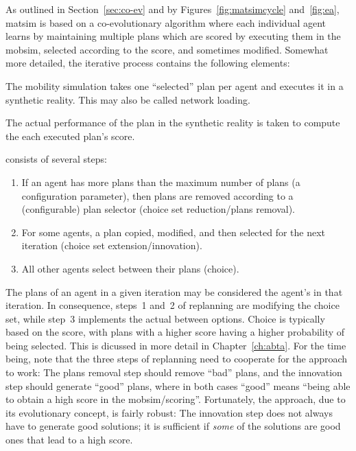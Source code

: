 As outlined in Section~\ref{sec:co-ev} and by Figures~\ref{fig:matsimcycle} and~\ref{fig:ea}, \gls{matsim} is based on a co-evolutionary algorithm where each individual agent learns by maintaining multiple plans which are scored by executing them in the mobsim, selected according to the score, and sometimes modified.  Somewhat more detailed, the iterative process contains the following elements:
%
\begin{description}\styleDescription
\item[mobsim] The mobility simulation takes one ``selected'' plan per agent and executes it in a synthetic reality.  This may also be called network loading.

\item [scoring] The actual performance of the plan in the synthetic reality is taken to compute the each executed plan's score.

\item [replanning] consists of several steps:
  \begin{enumerate}\styleEnumerate

  \item If an agent has more plans than the maximum number of plans (a configuration parameter), then plans are removed according to a (configurable) plan selector (choice set reduction/plans removal).

    \item For some agents, a plan copied, modified, and then selected for the next iteration (choice set extension/innovation).

  \item All other agents select between their plans (choice).
  \end{enumerate}
\end{description}

The plans of an agent in a given iteration may be considered the agent's  in that iteration.  In consequence, steps~1 and~2 of replanning are modifying the choice set, while step~3 implements the actual  between options.
%
Choice is typically based on the score, with plans with a higher score having a higher probability of being selected.  
%
This is dicussed in more detail in Chapter~\ref{ch:abta}.  For the time being, note that the three steps of replanning need to cooperate for the approach to work: The plans removal step should remove ``bad'' plans, and the innovation step should generate ``good'' plans, where in both cases ``good'' means ``being able to obtain a high score in the mobsim/scoring''.  Fortunately, the approach, due to its evolutionary concept, is fairly robust: The innovation step does not always have to generate good solutions; it is sufficient if \emph{some} of the solutions are good ones that lead to a high score.

